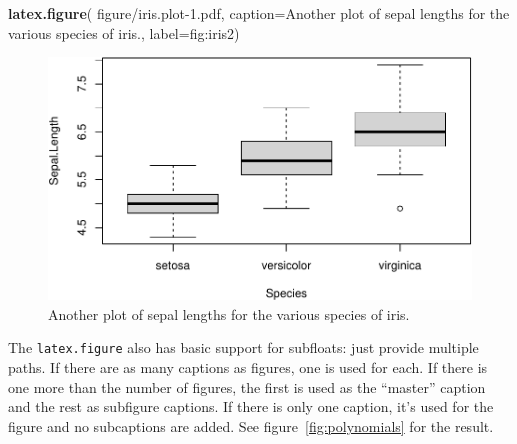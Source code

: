 \documentclass[a4paper,conference]{IEEEtran}
\newenvironment{Shaded}{\begin{snugshade}}{\end{snugshade}}
\newcommand{\AttributeTok}[1]{\textcolor[rgb]{0.13,0.29,0.53}{#1}}
\newcommand{\FunctionTok}[1]{\textcolor[rgb]{0.13,0.29,0.53}{\textbf{#1}}}
\newcommand{\NormalTok}[1]{#1}
\newcommand{\StringTok}[1]{\textcolor[rgb]{0.31,0.60,0.02}{#1}}
\begin{document}
\begin{Shaded}
\begin{Highlighting}[]
\FunctionTok{latex.figure}\NormalTok{(}
  \StringTok{\textquotesingle{}figure/iris.plot{-}1.pdf\textquotesingle{}}\NormalTok{,}
  \AttributeTok{caption=}\StringTok{\textquotesingle{}Another plot of sepal lengths}
\StringTok{           for the various species of iris.\textquotesingle{}}\NormalTok{,}
  \AttributeTok{label=}\StringTok{\textquotesingle{}fig:iris2\textquotesingle{}}\NormalTok{)}
\end{Highlighting}
\end{Shaded}

\begin{figure}[!t]%
\centering%
\includegraphics[width=\columnwidth]{figure/iris.plot-1.pdf}%
\caption{Another plot of sepal lengths
           for the various species of iris.}%
\label{fig:iris2}%
\end{figure}

The \texttt{latex.figure} also has basic support for subfloats: just
provide multiple paths. If there are as many captions as figures, one is
used for each. If there is one more than the number of figures, the
first is used as the ``master'' caption and the rest as subfigure
captions. If there is only one caption, it's used for the figure and no
subcaptions are added. See figure~\ref{fig:polynomials} for the result.
\end{document}
